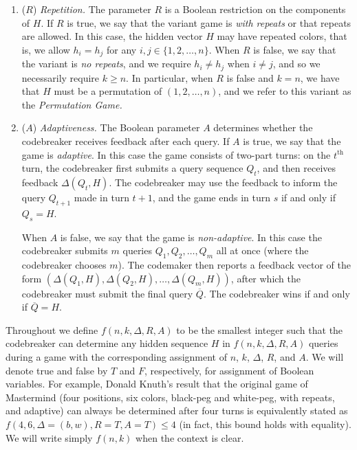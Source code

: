 \documentclass[12pt, a4paper]{article}
\newcommand{\nth}{^{\text{th}}}       %
\begin{document}
\begin{enumerate}[label=(\roman*)]
	\item($R$) \textit{Repetition.} The parameter $R$ is a Boolean restriction on the components of $H$. If $R$ is true, we say that the variant game is \textit{with repeats} or that repeats are allowed. In this case, the hidden vector $H$ may have repeated colors, that is, we allow $h_i = h_j$ for any $i,j\in\{1,2,\ldots, n\}$. When $R$ is false, we say that the variant is \textit{no repeats}, and we require $h_i\neq h_j$ when $i\neq j$, and so we necessarily require $k \geq n$. In particular, when $R$ is false and $k = n$, we have that $H$ must be a permutation of $(1, 2, \ldots, n)$, and we refer to this variant as the \textit{Permutation Game.}
	
	\item($A$) \textit{Adaptiveness.} The Boolean parameter $A$ determines whether the codebreaker receives feedback after each query. If $A$ is true, we say that the game is \textit{adaptive}. In this case the game consists of two-part turns: on the $t\nth$ turn, the codebreaker first submits a query sequence $Q_t$, and then receives feedback $\Delta(Q_t, H)$. The codebreaker may use the feedback to inform the query $Q_{t+1}$ made in turn $t+1$, and the game ends in turn $s$ if and only if $Q_s = H$.
	
	When $A$ is false, we say that the game is \textit{non-adaptive}. In this case the codebreaker submits $m$ queries $Q_1, Q_2, \ldots, Q_m$ all at once (where the codebreaker chooses $m$). The codemaker then reports a feedback vector of the form $(\Delta(Q_1, H), \Delta(Q_2, H), \ldots, \Delta(Q_m, H))$, after which the codebreaker must submit the final query $\overline{Q}$. The codebreaker wins if and only if $\overline{Q} = H$.
\end{enumerate}

Throughout we define $f(n, k, \Delta, R, A)$ to be the smallest integer such that the codebreaker can determine any hidden sequence $H$ in $f(n, k, \Delta, R, A)$ queries during a game with the corresponding assignment of $n$, $k$, $\Delta$, $R$, and $A$. We will denote true and false by $T$ and $F$, respectively, for assignment of Boolean variables. For example, Donald Knuth's result that the original game of Mastermind (four positions, six colors, black-peg and white-peg, with repeats, and adaptive) can always be determined after four turns is equivalently stated as $f(4, 6, \Delta = (b,w), R=T, A=T)\le 4$ (in fact, this bound holds with equality). We will write simply $f(n, k)$ when the context is clear.
\end{document}
